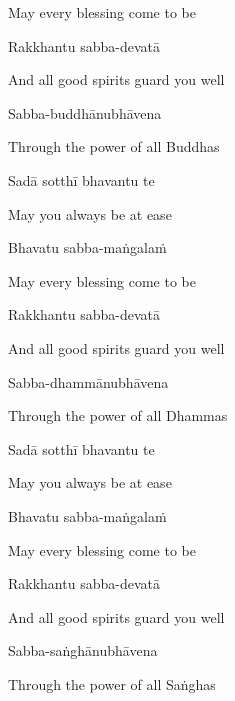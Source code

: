 \begin{english}
  May every blessing come to be
\end{english}

Rakkhantu sabba-devatā

\begin{english}
  And all good spirits guard you well
\end{english}

Sabba-buddhānubhāvena

\begin{english}
  Through the power of all Buddhas
\end{english}

Sadā sotthī bhavantu te

\begin{english}
  May you always be at ease
\end{english}

Bhavatu sabba-maṅgalaṁ

\begin{english}
  May every blessing come to be
\end{english}

Rakkhantu sabba-devatā

\begin{english}
  And all good spirits guard you well
\end{english}

Sabba-dhammānubhāvena

\begin{english}
  Through the power of all Dhammas
\end{english}

Sadā sotthī bhavantu te

\begin{english}
  May you always be at ease
\end{english}

Bhavatu sabba-maṅgalaṁ

\begin{english}
  May every blessing come to be
\end{english}

Rakkhantu sabba-devatā

\begin{english}
  And all good spirits guard you well
\end{english}

Sabba-saṅghānubhāvena

\begin{english}
  Through the power of all Saṅghas
\end{english}

